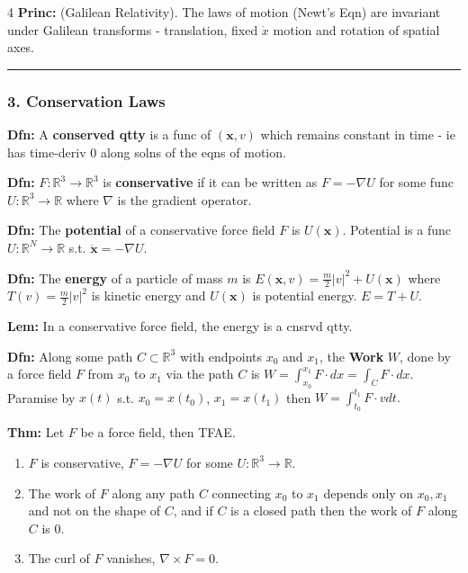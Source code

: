 \documentclass[landscape, 8pt]{extarticle}
\begin{document}
\begin{multicols*}{4}
		\textbf{Princ:} (Galilean Relativity). The laws of motion (Newt's Eqn) are invariant under Galilean transforms - translation, fixed $\dot{x}$ motion and rotation of spatial axes.
		
		\hrule
		\vspace*{-3pt}
		\subsubsection*{\tiny{3. Conservation Laws}}
		\vspace*{-5pt}
		
		\textbf{Dfn:} A \textbf{conserved qtty} is a func of $(\mathbf{x},v)$ which remains constant in time - ie has time-deriv $0$ along solns of the eqns of motion.
		
		\textbf{Dfn:} $F:\mathbb{R}^3\to\mathbb{R}^3$ is \textbf{conservative} if it can be written as $F=-\nabla U$ for some func $U:\mathbb{R}^3\to\mathbb{R}$ where $\nabla$ is the gradient operator.
		
		\textbf{Dfn:} The \textbf{potential} of a conservative force field $F$ is $U(\mathbf{x})$. Potential is a func $U:\mathbb{R}^N\to\mathbb{R}$ s.t. $\ddot{\mathbf{x}}=-\nabla U$.
		
		\textbf{Dfn:} The \textbf{energy} of a particle of mass $m$ is
		$
		E(\mathbf{x},v)=\frac{m}{2}|v|^2+U(\mathbf{x})
		$
		where $T(v)=\frac{m}{2}|v|^2$ is kinetic energy and $U(\mathbf{x})$ is potential energy. $E=T+U$.
		
		\textbf{Lem:} In a conservative force field, the energy is a cnsrvd qtty.
		
		\textbf{Dfn:} Along some path $C\subset\mathbb{R}^3$ with endpoints $x_0$ and $x_1$, the \textbf{Work} $W$, done by a force field $F$ from $x_0$ to $x_1$ via the path $C$ is
		$
		W = \int_{x_0}^{x_1} F\cdot dx = \int_C F\cdot dx.
		$
		Paramise by $x(t)$ s.t. $x_0=x(t_0)$, $x_1=x(t_1)$ then
		$
		W = \int_{t_0}^{t_1} F\cdot vdt.
		$
		
		\textbf{Thm:} Let $F$ be a force field, then TFAE.
		\begin{enumerate}[leftmargin=*,topsep=0pt,itemsep=0pt]
			\item $F$ is conservative, $F=-\nabla U$ for some $U:\mathbb{R}^3\to\mathbb{R}$.
			\item The work of $F$ along any path $C$ connecting $x_0$ to $x_1$ depends only on $x_0,x_1$ and not on the shape of $C$, and if $C$ is a closed path then the work of $F$ along $C$ is $0$.
			\item The curl of $F$ vanishes, $\nabla\times F=0$.
		\end{enumerate}
		

\end{multicols*}
\end{document}
